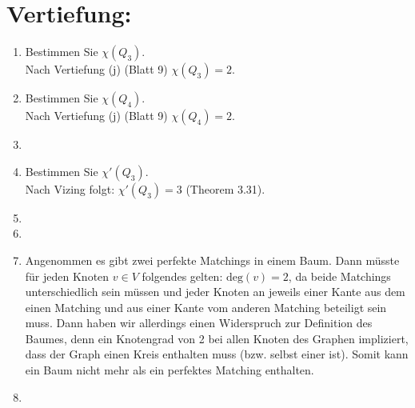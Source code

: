 

\usepackage{ tipa }


    \maketitle
    \section*{Vertiefung:}
    \begin{enumerate}[label=(\alph*)]
        \item Bestimmen Sie $\chi(Q_3)$.\\
        Nach Vertiefung (j) (Blatt 9) $\chi (Q_3) = 2$. 
                
        \item Bestimmen Sie $\chi(Q_4)$.\\
        Nach Vertiefung (j) (Blatt 9) $\chi (Q_4) = 2$.        
                
        \item
               
        \item Bestimmen Sie $\chi'(Q_3)$.\\
        Nach Vizing folgt: $\chi'(Q_3) = 3$ (Theorem 3.31).
        
        \item
        
        \item  
        
        \item 
        Angenommen es gibt zwei perfekte Matchings in einem Baum. Dann müsste für jeden Knoten $v \in V$ folgendes gelten: $\textrm{deg}(v) = 2$, da beide Matchings unterschiedlich sein müssen und jeder Knoten an jeweils einer Kante aus dem einen Matching und aus einer Kante vom anderen Matching beteiligt sein muss. Dann haben wir allerdings einen Widerspruch zur Definition des Baumes, denn ein Knotengrad von 2 bei allen Knoten des Graphen impliziert, dass der Graph einen Kreis enthalten muss (bzw. selbst einer ist). Somit kann ein Baum nicht mehr als ein perfektes Matching enthalten. 
        \item 
        
    \end{enumerate}
